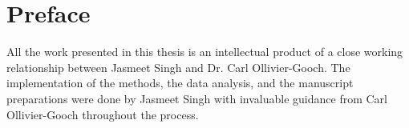 
\chapter{Preface}

All the work presented in this thesis is an intellectual product of a close working relationship between Jasmeet Singh and Dr. Carl Ollivier-Gooch. The implementation of the methods, the data analysis, and the manuscript preparations were done by Jasmeet Singh with invaluable guidance from Carl Ollivier-Gooch throughout the process.

